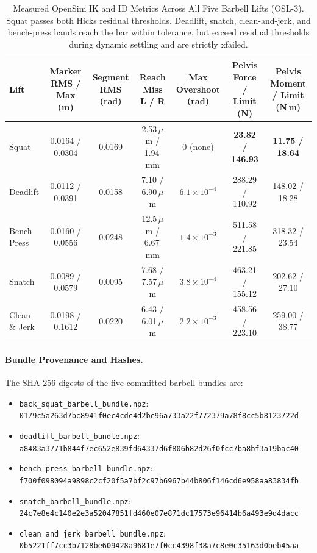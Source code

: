 \documentclass[11pt,a4paper]{article}
\begin{document}
\begin{table}[h]
\centering\footnotesize\setlength{\tabcolsep}{3pt}
\begin{tabular}{lcccccc}
\toprule
Lift & Marker RMS / Max (m) & Segment RMS (rad) & Reach Miss L / R & Max Overshoot (rad) & Pelvis Force / Limit (N) & Pelvis Moment / Limit (N\,m) \\
\midrule
Squat & 0.0164 / 0.0304 & 0.0169 & 2.53\,$\mu$m / 1.94\,mm & 0 (none) & \textbf{23.82 / 146.93} & \textbf{11.75 / 18.64} \\
Deadlift & 0.0112 / 0.0391 & 0.0158 & 7.10 / 6.90\,$\mu$m & $6.1\times 10^{-4}$ & 288.29 / 110.92 & 148.02 / 18.28 \\
Bench Press & 0.0160 / 0.0556 & 0.0248 & 12.5\,$\mu$m / 6.67\,mm & $1.4\times 10^{-3}$ & 511.58 / 221.85 & 318.32 / 23.54 \\
Snatch & 0.0089 / 0.0579 & 0.0095 & 7.68 / 7.57\,$\mu$m & $3.8\times 10^{-4}$ & 463.21 / 155.12 & 202.62 / 27.10 \\
Clean \& Jerk & 0.0198 / 0.1612 & 0.0220 & 6.43 / 6.01\,$\mu$m & $2.2\times 10^{-3}$ & 458.56 / 223.10 & 259.00 / 38.77 \\
\bottomrule
\end{tabular}
\caption{Measured OpenSim IK and ID Metrics Across All Five Barbell Lifts (OSL-3).
Squat passes both Hicks residual thresholds. Deadlift, snatch, clean-and-jerk, and bench-press hands reach
the bar within tolerance, but exceed residual thresholds during dynamic settling and are strictly xfailed.}
\label{tab:opensim-ik-id-all-five}
\end{table}

\paragraph{Bundle Provenance and Hashes.}
The SHA-256 digests of the five committed barbell bundles are:
\begin{itemize}[nosep]
\item \texttt{back\_squat\_barbell\_bundle.npz}: \texttt{0179c5a263d7bc8941f0ec4cdc4d2bc96a733a22f772379a78f8cc5b8123722d}
\item \texttt{deadlift\_barbell\_bundle.npz}: \texttt{a8483a3771b844f7ec652e839fd64337d6f806b82d26f0fcc7ba8bf3a19bac40}
\item \texttt{bench\_press\_barbell\_bundle.npz}: \texttt{f700f098094a9898c2cf20f5a7bf2c97b6967b44b806f146cd6e958aa83834fb}
\item \texttt{snatch\_barbell\_bundle.npz}: \texttt{24c7e8e4c140e2e3a52047851fd460e07e871dc17573e96414b6a493e9d4dacc}
\item \texttt{clean\_and\_jerk\_barbell\_bundle.npz}: \texttt{0b5221ff7cc3b7128be609428a9681e7f0cc4398f38a7c8e0c35163d0beb45aa}
\end{itemize}
\end{document}
